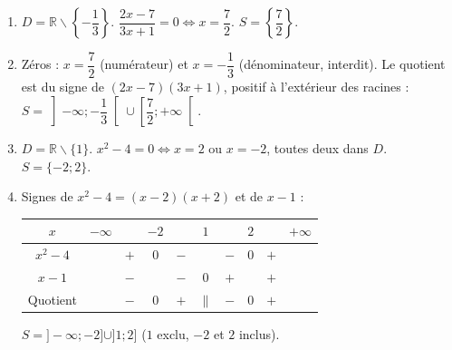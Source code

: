 \documentclass[11pt]{article}
\def\setminus{\mathbin{\backslash}}\let\smallsetminus\setminus
\begin{document}
\begin{corrige}
\begin{enumerate}
    \item $D=\mathbb{R}\setminus\left\{-\dfrac{1}{3}\right\}$. $\dfrac{2x-7}{3x+1}=0 \iff x=\dfrac{7}{2}$. $S=\left\{\dfrac{7}{2}\right\}$.
    \item Zéros : $x=\dfrac{7}{2}$ (numérateur) et $x=-\dfrac{1}{3}$ (dénominateur, interdit). Le quotient est du signe de $(2x-7)(3x+1)$, positif à l'extérieur des racines :
    $S=\left]-\infty;-\dfrac{1}{3}\right[\cup\left[\dfrac{7}{2};+\infty\right[$.
    \item $D=\mathbb{R}\setminus\{1\}$. $x^2-4=0 \iff x=2$ ou $x=-2$, toutes deux dans $D$. $S=\{-2;2\}$.
    \item Signes de $x^2-4=(x-2)(x+2)$ et de $x-1$ :
    \begin{center}
    \begin{tabular}{|c|ccccccccc|}\hline
    $x$ & $-\infty$ & & $-2$ & & $1$ & & $2$ & & $+\infty$ \\ \hline
    $x^2-4$ & & $+$ & $0$ & $-$ & & $-$ & $0$ & $+$ & \\ \hline
    $x-1$ & & $-$ & & $-$ & $0$ & $+$ & & $+$ & \\ \hline
    Quotient & & $-$ & $0$ & $+$ & $\|$ & $-$ & $0$ & $+$ & \\ \hline
    \end{tabular}
    \end{center}
    $S=]-\infty;-2]\cup]1;2]$ ($1$ exclu, $-2$ et $2$ inclus).
\end{enumerate}
\end{corrige}
\end{document}
